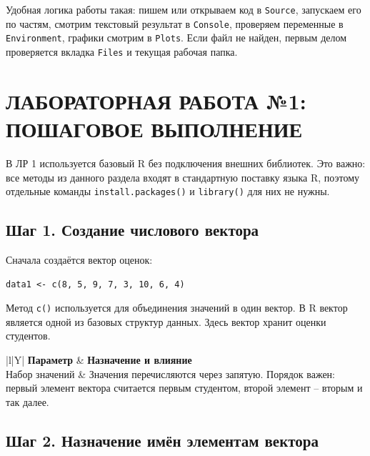 \documentclass[14pt,a4paper]{extarticle}
\begin{document}
Удобная логика работы такая: пишем или открываем код в \texttt{Source}, запускаем его по частям, смотрим текстовый результат в \texttt{Console}, проверяем переменные в \texttt{Environment}, графики смотрим в \texttt{Plots}. Если файл не найден, первым делом проверяется вкладка \texttt{Files} и текущая рабочая папка.

\newpage

\section{ЛАБОРАТОРНАЯ РАБОТА №1: ПОШАГОВОЕ ВЫПОЛНЕНИЕ}

В ЛР 1 используется базовый R без подключения внешних библиотек. Это важно: все методы из данного раздела входят в стандартную поставку языка R, поэтому отдельные команды \texttt{install.packages()} и \texttt{library()} для них не нужны.

\subsection{Шаг 1. Создание числового вектора}

Сначала создаётся вектор оценок:

\begin{lstlisting}
data1 <- c(8, 5, 9, 7, 3, 10, 6, 4)
\end{lstlisting}

Метод \texttt{c()} используется для объединения значений в один вектор. В R вектор является одной из базовых структур данных. Здесь вектор хранит оценки студентов.

\begin{table}[H]
\caption{Метод \texttt{c()} в ЛР 1}
\begin{tabularx}{\textwidth}{|l|Y|}
\hline
\textbf{Параметр} & \textbf{Назначение и влияние} \\
\hline
Набор значений & Значения перечисляются через запятую. Порядок важен: первый элемент вектора считается первым студентом, второй элемент -- вторым и так далее. \\
\hline
\end{tabularx}
\end{table}

\subsection{Шаг 2. Назначение имён элементам вектора}
\end{document}
